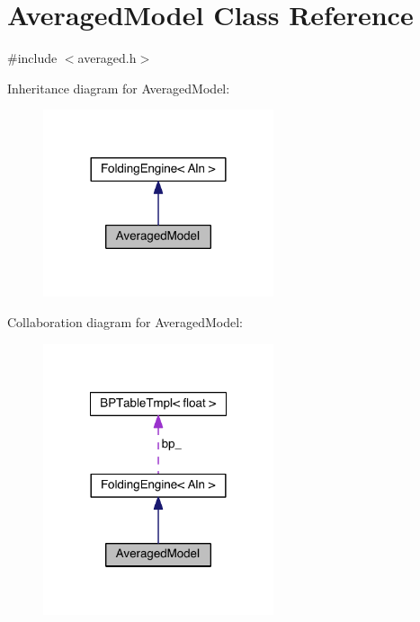 \hypertarget{class_averaged_model}{\section{Averaged\+Model Class Reference}
\label{class_averaged_model}
}


{\ttfamily \#include $<$averaged.\+h$>$}



Inheritance diagram for Averaged\+Model\+:
\nopagebreak
\begin{figure}[H]
\begin{center}
\leavevmode
\includegraphics[width=192pt]{class_averaged_model__inherit__graph}
\end{center}
\end{figure}


Collaboration diagram for Averaged\+Model\+:
\nopagebreak
\begin{figure}[H]
\begin{center}
\leavevmode
\includegraphics[width=192pt]{class_averaged_model__coll__graph}
\end{center}
\end{figure}
